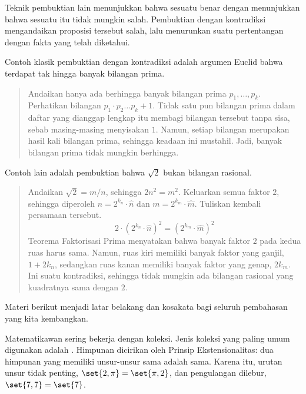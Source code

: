 Teknik pembuktian lain menunjukkan bahwa sesuatu benar dengan menunjukkan
bahwa sesuatu itu tidak mungkin salah.
Pembuktian dengan kontradiksi mengandaikan proposisi tersebut salah, lalu
menurunkan suatu pertentangan dengan fakta yang telah diketahui.

Contoh klasik pembuktian dengan kontradiksi adalah argumen Euclid bahwa
terdapat tak hingga banyak bilangan prima.
\begin{quote}\small
Andaikan hanya ada berhingga banyak bilangan prima \( p_1,\dots,p_k \).
Perhatikan bilangan \( p_1\cdot p_2\dots p_k +1 \).
Tidak satu pun bilangan prima dalam daftar yang dianggap lengkap itu membagi
bilangan tersebut tanpa sisa, sebab masing-masing menyisakan \( 1 \).
Namun, setiap bilangan merupakan hasil kali bilangan prima, sehingga keadaan
ini mustahil. Jadi, banyak bilangan prima tidak mungkin berhingga.
\end{quote}

Contoh lain adalah pembuktian bahwa \( \sqrt{2} \) bukan bilangan rasional.
\begin{quote}\small
Andaikan \( \sqrt{2}=m/n \), sehingga $2n^2=m^2$.
Keluarkan semua faktor \( 2 \), sehingga diperoleh
\( n=2^{k_n}\cdot \hat{n} \)
dan
\( m=2^{k_m}\cdot \hat{m} \).
Tuliskan kembali persamaan tersebut.
\begin{equation*}
  2\cdot (2^{k_n}\cdot \hat{n})^2
  =
  (2^{k_m}\cdot \hat{m})^2
\end{equation*}
Teorema Faktorisasi Prima menyatakan bahwa banyak faktor \( 2 \) pada kedua
ruas harus sama. Namun, ruas kiri memiliki banyak faktor yang ganjil,
\( 1+2k_n \), sedangkan ruas kanan memiliki banyak faktor yang genap,
\( 2k_m \). Ini suatu kontradiksi, sehingga tidak mungkin ada bilangan
rasional yang kuadratnya sama dengan \( 2 \).
\end{quote}














Materi berikut menjadi latar belakang dan kosakata bagi seluruh pembahasan
yang kita kembangkan.

Matematikawan sering bekerja dengan koleksi.
Jenis koleksi yang paling umum digunakan adalah .
Himpunan dicirikan oleh Prinsip Ekstensionalitas: dua himpunan yang memiliki
unsur-unsur sama adalah sama.
Karena itu, urutan unsur tidak penting,
\( \set{2,\pi}=\set{\pi,2} \), dan pengulangan dilebur,
\( \set{7,7}=\set{7} \).

